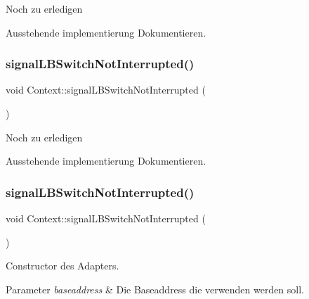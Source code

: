 \begin{DoxyRefDesc}{Noch zu erledigen}
\item[\hyperlink{todo__todo000004}{Noch zu erledigen}]Ausstehende implementierung Dokumentieren. \end{DoxyRefDesc}
\hypertarget{class_context_a4fd603eec47acc8a3671b7bdd3bdfe6d}{}\label{class_context_a4fd603eec47acc8a3671b7bdd3bdfe6d} 
\subsubsection{\texorpdfstring{signal\+L\+B\+Switch\+Not\+Interrupted()}{signalLBSwitchNotInterrupted()}\hspace{0.1cm}{\footnotesize\ttfamily [1/2]}}
{\footnotesize\ttfamily void Context\+::signal\+L\+B\+Switch\+Not\+Interrupted (\begin{DoxyParamCaption}{ }\end{DoxyParamCaption})}

\begin{DoxyRefDesc}{Noch zu erledigen}
\item[\hyperlink{todo__todo000007}{Noch zu erledigen}]Ausstehende implementierung Dokumentieren. \end{DoxyRefDesc}
\hypertarget{class_context_a4fd603eec47acc8a3671b7bdd3bdfe6d}{}\label{class_context_a4fd603eec47acc8a3671b7bdd3bdfe6d} 
\subsubsection{\texorpdfstring{signal\+L\+B\+Switch\+Not\+Interrupted()}{signalLBSwitchNotInterrupted()}\hspace{0.1cm}{\footnotesize\ttfamily [2/2]}}
{\footnotesize\ttfamily void Context\+::signal\+L\+B\+Switch\+Not\+Interrupted (\begin{DoxyParamCaption}{ }\end{DoxyParamCaption})}

Constructor des Adapters.


\begin{DoxyParams}{Parameter}
{\em baseaddress} & Die Baseaddress die verwenden werden soll. \\
\hline
\end{DoxyParams}
\hypertarget{class_context_a59ea683658907374dbe23125c11b1e93}{}\label{class_context_a59ea683658907374dbe23125c11b1e93} 
